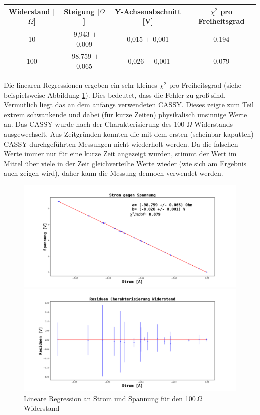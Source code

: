 \documentclass[12pt,a4paper]{article}
\begin{document}
\begin{center}
\begin{tabular}{|c|c|c|c|}
\hline 
Widerstand [$\Omega$] & Steigung [$\Omega$] & Y-Achsenabschnitt [V] & $\chi ^2$ pro Freiheitsgrad \\ 
\hline 
10 & -9,943 $\pm$ 0,009 & 0,015 $\pm$ 0,001 & 0,194 \\ 
\hline 
100 & -98,759 $\pm$ 0,065 & -0,026 $\pm$ 0,001 & 0,079 \\ 
\hline 
\end{tabular}
\end{center}

Die linearen Regressionen ergeben ein sehr kleines $\chi^2$ pro Freiheitsgrad (siehe beispielsweise Abbildung \ref{fig:Widerstand_lineare_Regression}). Dies bedeutet, dass die Fehler zu groß sind. Vermutlich liegt das an dem anfangs verwendeten CASSY. Dieses zeigte zum Teil extrem schwankende und dabei (für kurze Zeiten) physikalisch unsinnige Werte an. Das CASSY wurde nach der Charakterisierung des 100 $\Omega$ Widerstands ausgewechselt. Aus Zeitgründen konnten die mit dem ersten (scheinbar kaputten) CASSY durchgeführten Messungen nicht wiederholt werden. Da die falschen Werte immer nur für eine kurze Zeit angezeigt wurden, stimmt der Wert im Mittel über viele in der Zeit gleichverteilte Werte wieder (wie sich am Ergebnis auch zeigen wird), daher kann die Messung dennoch verwendet werden.
\begin{figure}
\begin{center}
\includegraphics[scale=0.45]{Bilder/Widerstand_Fit.png}
\end{center}
\begin{center}
\includegraphics[scale=0.45]{Bilder/Charakterisierung_Widerstand100_Residuen.png}
\end{center}
\caption[Widerstand Lineare Regression]{Lineare Regression an Strom und Spannung für den 100$\, \Omega$ Widerstand}
\label{fig:Widerstand_lineare_Regression}
\end{figure}
\end{document}
